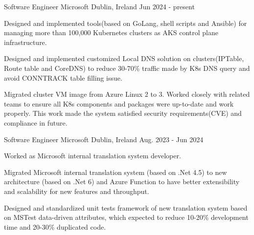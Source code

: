 

\begin{cventries}

    \cventry
        {Software Engineer}
        {Microsoft}
        {Dublin, Ireland}
        {Jun 2024 - present}
        {
            \begin{cvitems}
                \item 
                {
                    Designed and implemented tools(based on GoLang, shell scripts and Ansible) for managing more than 100,000 Kubernetes clusters as AKS control plane infrastructure.
                }
                \item
                {
                    Designed and implemented customized Local DNS solution on clusters(IPTable, Route table and CoreDNS) to reduce 30-70\% traffic made by K8s DNS query and avoid CONNTRACK table filling issue.
                }
                \item 
                {
                    Migrated cluster VM image from Azure Linux 2 to 3. Worked closely with related teams to ensure all K8s components and packages were up-to-date and work properly. This work made the system satisfied security requirements(CVE) and compliance in future.
                }
            \end{cvitems}
        }
    \cventry
        {Software Engineer}
        {Microsoft}
        {Dublin, Ireland}
        {Aug. 2023 - Jun 2024}
        {
            \begin{cvitems}
                \item
                {
                    Worked as Microsoft internal translation system developer.
                }
                \item
                {
                    Migrated Microsoft internal translation system (based on .Net 4.5) to new architecture (based on .Net 6) and Azure Function to have better extensibility and scalability for new features and throughput.
                }
                \item 
                {
                    Designed and standardized unit tests framework of new translation system based on MSTest data-driven attributes, which expected to reduce 10-20\% development time and 20-30\% duplicated code.
}
\end{cvitems}}
\end{cventries}
